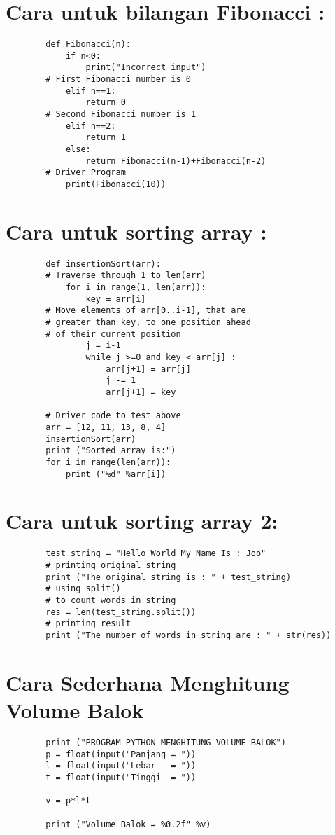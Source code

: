\documentclass{article}
\begin{document}
	\section {Cara untuk bilangan Fibonacci : }
	\begin{lstlisting}
		def Fibonacci(n):
			if n<0:
				print("Incorrect input")
		# First Fibonacci number is 0
			elif n==1:
				return 0
		# Second Fibonacci number is 1
			elif n==2:
				return 1
			else:
				return Fibonacci(n-1)+Fibonacci(n-2)
		# Driver Program
			print(Fibonacci(10)) 
	\end{lstlisting}

	\section {Cara untuk sorting array :}
	\begin{lstlisting}
		def insertionSort(arr):
		# Traverse through 1 to len(arr)
			for i in range(1, len(arr)):
				key = arr[i]
		# Move elements of arr[0..i-1], that are
		# greater than key, to one position ahead
		# of their current position
				j = i-1
				while j >=0 and key < arr[j] :
					arr[j+1] = arr[j]
					j -= 1
					arr[j+1] = key
		
		# Driver code to test above
		arr = [12, 11, 13, 8, 4]
		insertionSort(arr)
		print ("Sorted array is:")
		for i in range(len(arr)):
			print ("%d" %arr[i]) 
	\end{lstlisting}

	\section {Cara untuk sorting array 2:}
	\begin{lstlisting}
		test_string = "Hello World My Name Is : Joo"
		# printing original string
		print ("The original string is : " + test_string)
		# using split()
		# to count words in string
		res = len(test_string.split())
		# printing result
		print ("The number of words in string are : " + str(res)) 
	\end{lstlisting}

	\section {Cara Sederhana Menghitung Volume Balok}
	\begin{lstlisting}
		print ("PROGRAM PYTHON MENGHITUNG VOLUME BALOK")
		p = float(input("Panjang = "))
		l = float(input("Lebar   = "))
		t = float(input("Tinggi  = "))
		
		v = p*l*t
		
		print ("Volume Balok = %0.2f" %v)
	\end{lstlisting}
\end{document}
